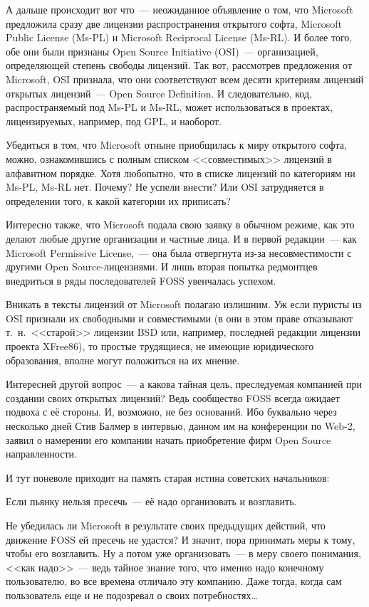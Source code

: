 А дальше происходит вот что~--- неожиданное объявление о том, что Microsoft предложила сразу две лицензии распространения открытого софта, Microsoft Public License (Ms-PL) и Microsoft Reciprocal License (Ms-RL). И более того, обе они были признаны Open Source Initiative (OSI)~--- организацией, определяющей степень свободы лицензий. Так вот, рассмотрев предложения от Microsoft, OSI признала, что они соответствуют всем десяти критериям лицензий открытых лицензий~--- Open Source Definition. И следовательно, код, распространяемый под Ms-PL и Ms-RL, может использоваться в проектах, лицензируемых, например, под GPL, и наоборот.

Убедиться в том, что Microsoft отныне приобщилась к миру открытого софта, можно, ознакомившись с полным списком <<совместимых>> лицензий в алфавитном порядке. Хотя любопытно, что в списке лицензий по категориям ни Ms-PL, Ms-RL нет. Почему? Не успели внести? Или OSI затрудняется в определении того, к какой категории их приписать?

Интересно также, что Microsoft подала свою заявку в обычном режиме, как это делают любые другие организации и частные лица. И в первой редакции~--- как Microsoft Permissive License,~--- она была отвергнута из-за несовместимости с другими Open Source-лицензиями. И лишь вторая попытка редмонтцев внедриться в ряды последователей FOSS увенчалась успехом.

Вникать в тексты лицензий от Microsoft полагаю излишним. Уж если пуристы из OSI признали их свободными и совместимыми (в они в этом праве отказывают т.~н.~<<старой>> лицензии BSD или, например, последней редакции лицензии проекта XFree86), то простые трудящиеся, не имеющие юридического образования, вполне могут положиться на их мнение.

Интересней другой вопрос~--- а какова тайная цель, преследуемая компанией при создании своих открытых лицензий? Ведь сообщество FOSS всегда ожидает подвоха с её стороны. И, возможно, не без оснований. Ибо буквально через несколько дней Стив Балмер в интервью, данном им на конференции по Web-2, заявил о намерении его компании начать приобретение фирм Open Source направленности.

И тут поневоле приходит на память старая истина советских начальников:


\begin{shadequote}{}
Если пьянку нельзя пресечь~--- её надо организовать и возглавить.
\end{shadequote}

Не убедилась ли Microsoft в результате своих предыдущих действий, что движение FOSS ей пресечь не удастся? И значит, пора принимать меры к тому, чтобы его возглавить. Ну а потом уже организовать~--- в меру своего понимания, <<как надо>>~--- ведь тайное знание того, что именно надо конечному пользователю, во все времена отличало эту компанию. Даже тогда, когда сам пользователь еще и не подозревал о своих потребностях\dots

